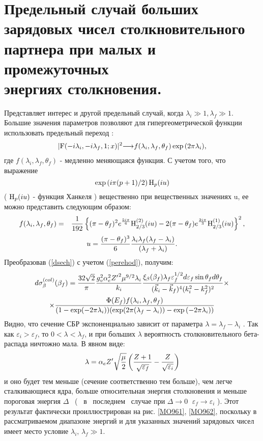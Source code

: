\section{Предельный случай больших зарядовых чисел столкновительного партнера
при малых и промежуточных \\ энергиях столкновения.}

Представляет интерес и другой предельный случай, когда
$  \lambda_i \gg 1,  \lambda_f \gg 1.$
Большие значения параметров позволяют для гипергеометрической функции  использовать предельный переход \cite{zomm}:
\begin{eqnarray}\label{perehod}
|{\rm F}(-i\lambda_i,-i\lambda_f,1;x)|^2
{\longrightarrow}f(\lambda_i,\lambda_f,\theta_f) \exp{(2 \pi \lambda_i)},
\end{eqnarray}
где  $f(\lambda_i,\lambda_f,\theta_f)$ - медленно меняющаяся функция.
С учетом того, что выражение
$$
\exp\left({{i \pi (p+1)}/{2}}\right){\rm H}_{p}(i u)
$$
( ${\rm H}_{p}(i u)$ - функция Ханкеля )
вещественно при вещественных значениях u, ее можно представить следующим образом:
\begin{eqnarray}
f(\lambda_i,\lambda_f,\theta_f)&=&{1\over{192}}\left\{ (\pi - \theta_f)^2
e^{{5 i \pi}\over{6}}{\rm H}^{(2)}_{2/3}(i u) -
2(\pi - \theta_f) e^{{2 i \pi}\over{3}}{\rm H}^{(1)}_{2/3}(i u) \right\}^2 ,\nonumber
\end{eqnarray}
\begin{eqnarray}
u={{(\pi - \theta_f)^3}\over 6}{{\lambda_i \lambda_f ( \lambda_f - \lambda_i )}
\over{( \lambda_f + \lambda_i )}}.\nonumber
\end{eqnarray}
Преобразовав (\ref{dsech}) с учетом (\ref{perehod}), получим:
\begin{multline} \label{dsechbig}
d\sigma^{(col)}_\beta(\beta_f)=
{32\sqrt{2}\over \pi}{{g^2_v\alpha_e^2{Z'}^2
\mu^{9/2}\lambda_i} \over k_i}{{\xi_\beta(\beta_f)
\lambda_f \varepsilon_f^{1/2}d\varepsilon_f\sin \theta_f
d\theta_f}\over{(\vec k_i-\vec k_f)^4(k^2_i-k^2_f)^2}}
\times\\
\times
{{\Phi (E_f) f(\lambda_i, \lambda_f,\theta_f)}\over
{(1-\exp(-2\pi\lambda_i))(\exp(2\pi(\lambda_f-\lambda_i))-\exp{(-2\pi\lambda_i)})}}
\end{multline}
Видно, что сечение СБР экспоненциально зависит от параметра
$\lambda=\lambda_f -\lambda_i$ .
Так как $\varepsilon_i >\varepsilon_f$, то $0<\lambda <\lambda_f$,
и при больших $\lambda$  вероятность
столкновительного бета-распада ничтожно мала.
В явном виде:
\begin{eqnarray} \label{lambda}
\lambda= \alpha_e Z' \sqrt{{{\mu}\over{2}}}\left({{Z+1}\over
{\sqrt{\varepsilon_f}}}-{{Z}\over{\sqrt{\varepsilon_i}}}\right)
\end{eqnarray}
и оно будет тем меньше (сечение соответственно тем больше), чем легче
сталкивающиеся ядра, больше относительная энергия столкновения и
меньше пороговая энергия $\Delta$~ (~ в~ последнем~ случае при $\Delta\to 0$
$\;\varepsilon_f\to\varepsilon_i$ ). Этот результат фактически проиллюстрирован
на рис. \ref{MO961}, \ref{MO962}, поскольку в рассматриваемом диапазоне энергий
и для указанных
значений зарядовых чисел имеет место условие $\lambda_i,\,\lambda_f\gg 1$.


